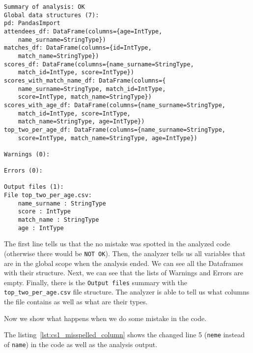 \begin{lstlisting}[caption=Output of Pandalyzer on the first case study, label={lst:cs1_pandalyzer_normal}, captionpos=b]
Summary of analysis: OK
Global data structures (7):
pd: PandasImport
attendees_df: DataFrame(columns={age=IntType,
    name_surname=StringType})
matches_df: DataFrame(columns={id=IntType,
    match_name=StringType})
scores_df: DataFrame(columns={name_surname=StringType,
    match_id=IntType, score=IntType})
scores_with_match_name_df: DataFrame(columns={
    name_surname=StringType, match_id=IntType,
    score=IntType, match_name=StringType})
scores_with_age_df: DataFrame(columns={name_surname=StringType,
    match_id=IntType, score=IntType,
    match_name=StringType, age=IntType})
top_two_per_age_df: DataFrame(columns={name_surname=StringType,
    score=IntType, match_name=StringType, age=IntType})

Warnings (0):

Errors (0):

Output files (1):
File top_two_per_age.csv:
    name_surname : StringType
    score : IntType
    match_name : StringType
    age : IntType
\end{lstlisting}

The first line tells us that the no mistake was spotted in the analyzed code (otherwise there would be \verb|NOT OK|).
Then, the analyzer tells us all variables that are in the global scope when the analysis ended.
We can see all the Dataframes with their structure.
Next, we can see that the lists of Warnings and Errors are empty.
Finally, there is the \verb|Output files| summary with the \verb|top_two_per_age.csv| file structure.
The analyzer is able to tell us what columns the file contains as well as what are their types.

Now we show what happens when we do some mistake in the code.

The listing~\ref{lst:cs1_misspelled_column} shows the changed line 5 (\verb|neme| instead of \verb|name|) in the code as
well as the analysis output.

